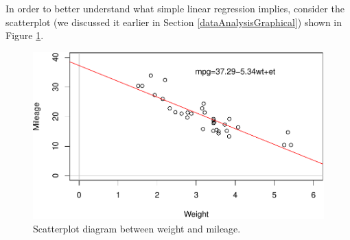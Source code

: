 \documentclass[
]{book}
\newenvironment{Shaded}{\begin{snugshade}}{\end{snugshade}}
\newcommand{\DataTypeTok}[1]{\textcolor[rgb]{0.13,0.29,0.53}{#1}}
\newcommand{\DecValTok}[1]{\textcolor[rgb]{0.00,0.00,0.81}{#1}}
\newcommand{\KeywordTok}[1]{\textcolor[rgb]{0.13,0.29,0.53}{\textbf{#1}}}
\newcommand{\NormalTok}[1]{#1}
\newcommand{\OperatorTok}[1]{\textcolor[rgb]{0.81,0.36,0.00}{\textbf{#1}}}
\newcommand{\StringTok}[1]{\textcolor[rgb]{0.31,0.60,0.02}{#1}}
\theoremstyle{definition}
\theoremstyle{definition}
\theoremstyle{definition}
\theoremstyle{definition}
\theoremstyle{remark}
\begin{document}
In order to better understand what simple linear regression implies, consider the scatterplot (we discussed it earlier in Section \ref{dataAnalysisGraphical}) shown in Figure \ref{fig:scatterWeightMPG2}.

\begin{Shaded}
\end{Shaded}

\begin{figure}
\centering
\includegraphics{Svetunkov---Statistics-for-Business-Analytics_files/figure-latex/scatterWeightMPG2-1.pdf}
\caption{\label{fig:scatterWeightMPG2}Scatterplot diagram between weight and mileage.}
\end{figure}
\end{document}
